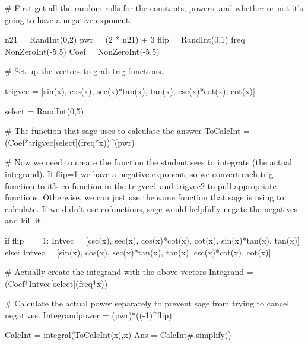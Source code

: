 
\begin{sagesilent}
# First get all the random rolls for the constants, powers, and whether or not it's going to have a negative exponent.

n21 = RandInt(0,2)
pwr = (2 * n21) + 3
flip = RandInt(0,1)
freq = NonZeroInt(-5,5)
Coef = NonZeroInt(-5,5)

# Set up the vectors to grab trig functions.

trigvec = [sin(x), cos(x), sec(x)*tan(x), tan(x), csc(x)*cot(x), cot(x)]

select = RandInt(0,5)

# The function that sage uses to calculate the answer
ToCalcInt = (Coef*trigvec[select](freq*x))^(pwr)

# Now we need to create the function the student sees to integrate (the actual integrand). If flip=1 we have a negative exponent, so we convert each trig function to it's co-function in the trigvec1 and trigvec2 to pull appropriate functions. Otherwise, we can just use the same function that sage is using to calculate. If we didn't use cofunctions, sage would helpfully negate the negatives and kill it.

if flip == 1:
    Intvec = [csc(x), sec(x), cos(x)*cot(x), cot(x), sin(x)*tan(x), tan(x)]
else:
    Intvec = [sin(x), cos(x), sec(x)*tan(x), tan(x), csc(x)*cot(x), cot(x)]

# Actually create the integrand with the above vectors
Integrand = (Coef*Intvec[select](freq*x))

# Calculate the actual power separately to prevent sage from trying to cancel negatives.
Integrandpower = (pwr)*((-1)^flip)

CalcInt = integral(ToCalcInt(x),x)
Ans = CalcInt#.simplify()
\end{sagesilent}



